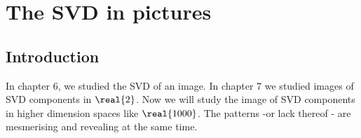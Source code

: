 \chapter{The SVD in pictures}

\section{Introduction}
In chapter 6, we studied the SVD of an image. In chapter 7 we studied images of SVD components in $\real{2}$. Now we will study the image of SVD components in higher dimension spaces like $\real{1000}$. The patterns -or lack thereof - are mesmerising and revealing at the same time.



%

\endinput